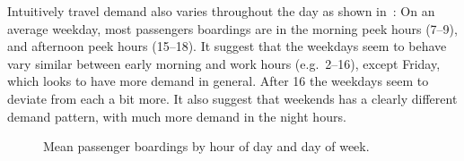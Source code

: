 Intuitively travel demand also varies throughout the day as shown in~: On an average weekday, most passengers boardings are in the morning peek hours (7--9), and afternoon peek hours (15--18). It suggest that the weekdays seem to behave vary similar between early morning and work hours (e.g.\ 2--16), except Friday, which looks to have more demand in general. After 16 the weekdays seem to deviate from each a bit more. It also suggest that weekends has a clearly different demand pattern, with much more demand in the night hours.
\begin{figure}[!ht]
    \center
    
    \vspace{-2em}
    \caption{Mean passenger boardings by hour of day and day of week.}
    \label{fig:travelcard_hist}
\end{figure}
